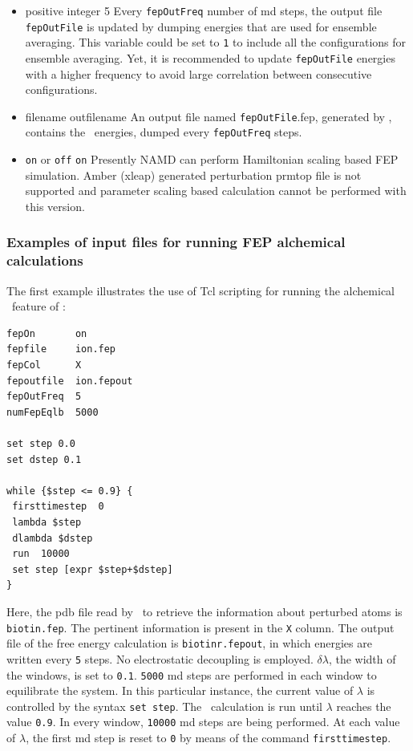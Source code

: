 \begin{itemize}
\item
{}
{positive integer}
{5}
{Every {\tt fepOutFreq} number of {\sc md} steps, the output file
{\tt fepOutFile} is updated by dumping energies that are
used for ensemble averaging.
This variable could be set to {\tt 1} to include all the 
configurations for ensemble averaging. Yet, it is recommended
to update {\tt fepOutFile}  energies with a
higher frequency 
to avoid large correlation between consecutive configurations.}

\item
{}
{filename}
{outfilename}
{An output file named {\tt fepOutFile}.fep, generated by \NAMD,
contains the \FEP\ energies, dumped every {\tt fepOutFreq} steps.}

\item
{}
{{\tt on} or {\tt off}}
{{\tt on}}
{Presently NAMD can perform Hamiltonian scaling based FEP simulation.
Amber (xleap) generated perturbation prmtop file is not supported
and parameter scaling based calculation cannot be performed with this
version.}

\end{itemize}


\subsubsection{Examples of input files for running FEP alchemical calculations}


The first example illustrates the use of {\sc Tcl} scripting for running
the alchemical \FEP\ feature of \NAMD: 

\begin{verbatim}
fepOn		on  
fepfile		ion.fep
fepCol		X
fepoutfile	ion.fepout
fepOutFreq	5
numFepEqlb	5000

set step 0.0
set dstep 0.1

while {$step <= 0.9} {
 firsttimestep	0
 lambda $step
 dlambda $dstep
 run  10000
 set step [expr $step+$dstep]
}
\end{verbatim}

Here, the {\sc pdb} file read by \NAMD\ to retrieve the information
about perturbed atoms is {\tt biotin.fep}. The pertinent information 
is present in the {\tt X} column. The output file of the free energy
calculation is {\tt biotinr.fepout}, in which energies are written
every {\tt 5} steps. No electrostatic decoupling is employed. 
$\delta \lambda$, the width of the windows, is set to {\tt 0.1}.
{\tt 5000} {\sc md} steps are performed in each window to
equilibrate the system. In this particular instance, 
the current value of $\lambda$
is controlled by the syntax {\tt set step}. 
The \FEP\ calculation is run until $\lambda$ reaches the
value {\tt 0.9}. In every window, {\tt 10000} {\sc md} steps
are being performed. At each value of $\lambda$, the first 
{\sc md} step is reset to {\tt 0} by means of the command
 {\tt firsttimestep}.



